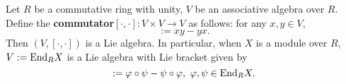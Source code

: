 \begin{proposition}
  Let
    $R$ be a commutative ring with unity,
    $V$ be an associative algebra over $R$.
  Define the \textbf{commutator}$ [\cdot, \cdot] \colon V \times V \to V$
  as follows: for any $x, y \in V$,
  \begin{equation}
    [x, y] := x y - y x.
  \end{equation}
  Then $(V, [\cdot, \cdot])$ is a Lie algebra.
  In particular, when $X$ is a module over $R$, $V := {\rm End}_R X$ is a Lie
  algebra with Lie bracket given by
  \begin{equation}
    [\varphi, \psi] := \varphi \circ \psi - \psi \circ \varphi,\
    \varphi, \psi \in {\rm End}_R X.
  \end{equation}
\end{proposition}
